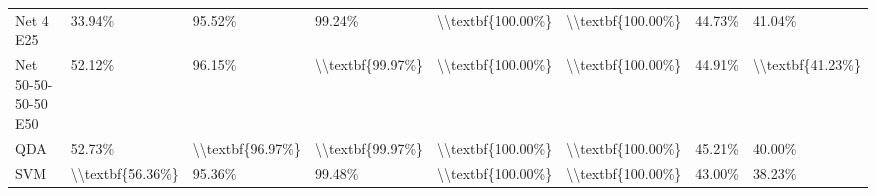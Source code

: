 \begin{tabular}{llllllll}
Net 4 E25           &            33.94\% &            95.52\% &            99.24\% &  \textbackslash \textbackslash textbf\{100.00\%\} &  \textbackslash \textbackslash textbf\{100.00\%\} &            44.73\% &            41.04\% \\
Net 50-50-50-50 E50 &            52.12\% &            96.15\% &  \textbackslash \textbackslash textbf\{99.97\%\} &  \textbackslash \textbackslash textbf\{100.00\%\} &  \textbackslash \textbackslash textbf\{100.00\%\} &            44.91\% &  \textbackslash \textbackslash textbf\{41.23\%\} \\
QDA                 &            52.73\% &  \textbackslash \textbackslash textbf\{96.97\%\} &  \textbackslash \textbackslash textbf\{99.97\%\} &  \textbackslash \textbackslash textbf\{100.00\%\} &  \textbackslash \textbackslash textbf\{100.00\%\} &            45.21\% &            40.00\% \\
SVM                 &  \textbackslash \textbackslash textbf\{56.36\%\} &            95.36\% &            99.48\% &  \textbackslash \textbackslash textbf\{100.00\%\} &  \textbackslash \textbackslash textbf\{100.00\%\} &            43.00\% &            38.23\% \\
\bottomrule
\end{tabular}
